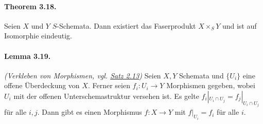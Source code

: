 \paragraph{Theorem 3.18.}\label{3.18} Seien $X$ und $Y$ $S$-Schemata. Dann existiert das Faserprodukt $X\times_S Y$ und ist auf Isomorphie eindeutig.

\paragraph{Lemma 3.19.}\label{3.19} \textit{(Verkleben von Morphismen, vgl. \hyperref[2.13]{Satz 2.13})} Seien $X,Y$ Schemata und $\{U_i\}$ eine offene Überdeckung von $X$. Ferner seien $f_i:U_i\to Y$ Morphismen gegeben, wobei $U_i$ mit der offenen Unterschemastruktur versehen ist. Es gelte $f_i|_{U_i\cap U_j}=f_j|_{U_i\cap U_j}$ für alle $i,j$. Dann gibt es einen Morphismus $f:X\to Y$ mit $f|_{U_i}=f_i$ für alle $i$.

